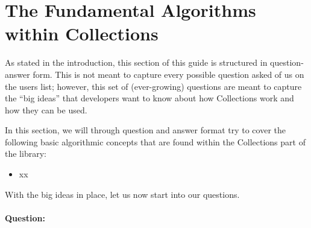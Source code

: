 %
\section{The Fundamental Algorithms within Collections}

As stated in the introduction, this section of this guide is structured in question-answer form.  This is not meant to capture every possible
question asked of us on the {\nek} users list; however, this set of (ever-growing) questions are meant to capture the ``big ideas'' that developers 
want to know about how Collections work and how they can be used.  

In this section, we will through question and answer format try to cover the following basic algorithmic concepts that are found within 
the Collections part of the library:

\begin{itemize}
\item xx
\end{itemize}

With the big ideas in place, let us now start into our questions.

\paragraph{Question:}
